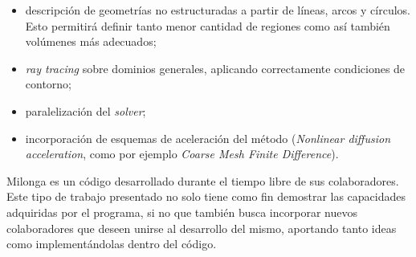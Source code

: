 \documentclass[11pt]{article}
\numberwithin{equation}{section}
\begin{document}
\begin{itemize}
\renewcommand\labelitemi{$\cdot$}
 \item descripción de geometrías no estructuradas a partir de líneas, arcos y círculos. Esto permitirá definir tanto menor cantidad de regiones como así también volúmenes más adecuados;
 \item \emph{ray tracing} sobre dominios generales, aplicando correctamente condiciones de contorno;
 \item paralelización del \emph{solver};
 \item incorporación de esquemas de aceleración del método (\emph{Nonlinear diffusion acceleration}, como por ejemplo \emph{Coarse Mesh Finite Difference}).
\end{itemize}

Milonga es un c\'odigo desarrollado durante el tiempo libre de sus colaboradores. Este tipo de trabajo presentado no solo tiene como fin demostrar las capacidades adquiridas por el programa, si no que también busca incorporar nuevos colaboradores que deseen unirse al desarrollo del mismo, aportando tanto ideas como implementándolas dentro del c\'odigo. 

\pagebreak
\printbibliography
\label{lastpage}
\end{document}
